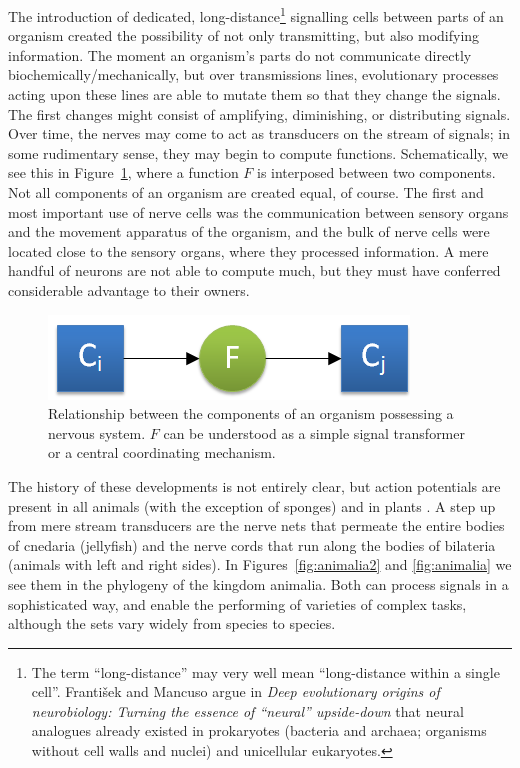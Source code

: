 The introduction of dedicated, long-distance\footnote{The term ``long-distance'' may very well mean ``long-distance within a single cell''. Franti\v{s}ek and Mancuso argue in {\em Deep evolutionary origins of neurobiology: Turning the essence of ``neural'' upside-down} \cite{frantisek} that neural analogues already existed in prokaryotes (bacteria and archaea; organisms without cell walls and nuclei) and unicellular eukaryotes.} signalling cells between parts of an organism created the possibility of not only transmitting, but also modifying information. The moment an organism's parts do not communicate directly biochemically/mechanically, but over transmissions lines, evolutionary processes acting upon these lines are able to mutate them so that they change the signals. The first changes might consist of amplifying, diminishing, or distributing signals. Over time, the nerves may come to act as transducers on the stream of signals; in some rudimentary sense, they may begin to compute functions. Schematically, we see this in Figure~\ref{fig:nervousSystem}, where a function $F$ is interposed between two components. Not all components of an organism are created equal, of course. The first and most important use of nerve cells was the communication between sensory organs and the movement apparatus of the organism, and the bulk of nerve cells were located close to the sensory organs, where they processed information. A mere handful of neurons are not able to compute much, but they must have conferred considerable advantage to their owners.

\begin{figure}
	\centering
	\includegraphics{Figs/nervousSystem.png}
	\caption{Relationship between the components of an organism possessing a nervous system. $F$ can be understood as a simple signal transformer or a central coordinating mechanism.}
	\label{fig:nervousSystem}
\end{figure}

The history of these developments is not entirely clear, but action potentials are present in all animals (with the exception of sponges) and in plants \cite{Leys01051999, PCE:PCE1614}. 
A step up from mere stream transducers are the nerve nets that permeate the entire bodies of cnedaria (jellyfish) and the nerve cords that run along the bodies of bilateria (animals with left and right sides). In Figures~\ref{fig:animalia2} and \ref{fig:animalia} we see them in the phylogeny of the kingdom animalia. Both can process signals in a sophisticated way, and enable the performing of varieties of complex tasks, although the sets vary widely from species to species.

